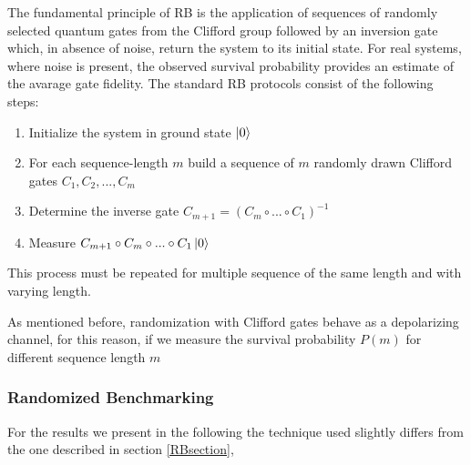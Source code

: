 The fundamental principle of RB is the application of sequences of randomly selected quantum gates from the Clifford group  followed by an inversion gate which, in absence of noise, return the system to its initial state. 
For real systems, where noise is present, the observed survival probability provides an estimate of the avarage gate fidelity.
The standard RB protocols consist of the following steps:\begin{enumerate}
    \item Initialize the system in ground state $\ket{0}$
    \item For each sequence-length $m$ build a sequence of $m$ randomly drawn Clifford gates $C_1, C_2, ..., C_m$
    \item Determine the inverse gate $C_{m+1}=(C_m\circ...\circ C_1)^{-1}$
    \item Measure $C_{m+1}\circ C_m \circ ...\circ C_1 \ket{0}$
\end{enumerate}
This process must be repeated for multiple sequence of the same length and with varying length.

As mentioned before, randomization with Clifford gates behave as a depolarizing channel, for this reason, if we measure the survival probability $P(m)$ for different sequence length $m$

\subsubsection{Randomized Benchmarking}
For the results we present in the following the technique used slightly differs from the one described in section \ref{RBsection}, %

